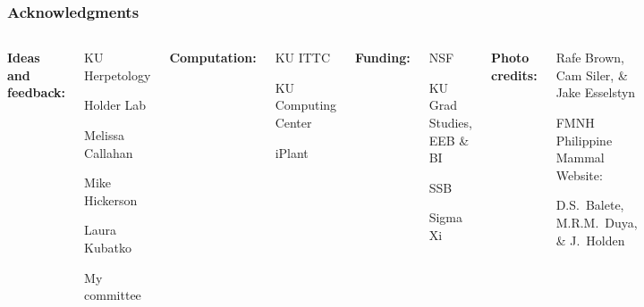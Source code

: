 \begin{frame}
    \frametitle{Acknowledgments}
    \begin{columns}[c]
            {\bf Ideas and feedback:}
            \begin{myitemize}
                \item KU Herpetology
                \item Holder Lab
                \item Melissa Callahan
                \item Mike Hickerson
                \item Laura Kubatko
                \item My committee
            \end{myitemize}
            \smallskip
            {\bf Computation:}
            \begin{myitemize}
                \item KU ITTC
                \item KU Computing Center
                \item iPlant
            \end{myitemize}
            {\bf Funding:}
            \begin{myitemize}
                \item NSF
                \item KU Grad Studies, EEB \& BI
                \item SSB
                \item Sigma Xi
            \end{myitemize}
            \smallskip
            {\bf Photo credits:}
            \begin{myitemize}
                \item Rafe Brown, Cam Siler, \& Jake Esselstyn
                \item FMNH Philippine Mammal Website:
                    \begin{myitemize}
                        \item D.S.\ Balete, M.R.M.\ Duya, \& J.\ Holden
                    \end{myitemize}
            \end{myitemize}
    \end{columns}
\end{frame}

